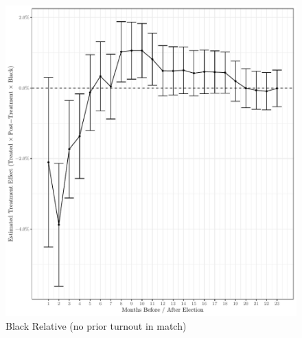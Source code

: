 \documentclass[
  12pt,
]{article}
\begin{document}
\begin{figure}[H]

{\centering \includegraphics{compile_files/figure-latex/black-relative-no-prior-1} 

}

\caption{\label{fig:did-1}Black Relative (no prior turnout in match)}\label{fig:black-relative-no-prior}
\end{figure}
\end{document}
